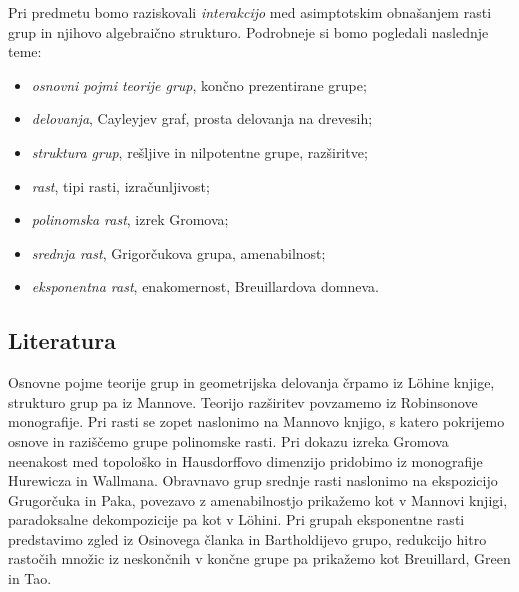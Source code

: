 \documentclass[11pt]{book}
\theoremstyle{definition}
\theoremstyle{zgled}
\theoremstyle{odprtproblem}
\theoremstyle{domacanaloga}
\theoremstyle{izrek}
\begin{document}
Pri predmetu bomo raziskovali {\em interakcijo} med asimptotskim obnašanjem rasti grup in njihovo algebraično strukturo. Podrobneje si bomo pogledali naslednje teme:

\begin{itemize}
\item {\em osnovni pojmi teorije grup}, končno prezentirane grupe;
\item {\em delovanja}, Cayleyjev graf, prosta delovanja na drevesih;
\item {\em struktura grup}, rešljive in nilpotentne grupe, razširitve;
\item {\em rast}, tipi rasti, izračunljivost;
\item {\em polinomska rast}, izrek Gromova;
\item {\em srednja rast}, Grigorčukova grupa, amenabilnost;
\item {\em eksponentna rast}, enakomernost, Breuillardova domneva.
\end{itemize}

\subsection*{Literatura}

Osnovne pojme teorije grup in geometrijska delovanja črpamo iz Löhine knjige, strukturo grup pa iz Mannove. Teorijo razširitev povzamemo iz Robinsonove monografije. Pri rasti se zopet naslonimo na Mannovo knjigo, s katero pokrijemo osnove in raziščemo grupe polinomske rasti. Pri dokazu izreka Gromova neenakost med topološko in Hausdorffovo dimenzijo pridobimo iz monografije Hurewicza in Wallmana. Obravnavo grup srednje rasti naslonimo na ekspozicijo Grugorčuka in Paka, povezavo z amenabilnostjo prikažemo kot v Mannovi knjigi, paradoksalne dekompozicije pa kot v Löhini. Pri grupah eksponentne rasti predstavimo zgled iz Osinovega članka in Bartholdijevo grupo, redukcijo hitro rastočih množic iz neskončnih v končne grupe pa prikažemo kot Breuillard, Green in Tao.
\end{document}
